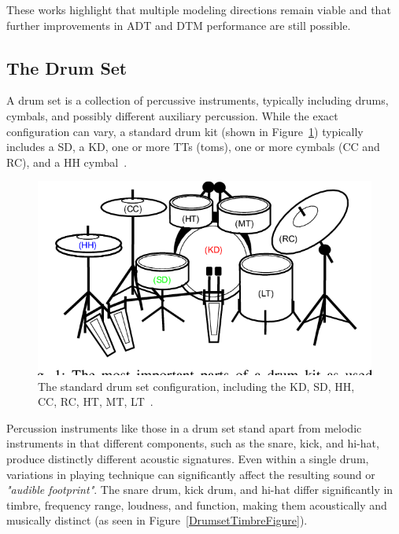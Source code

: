These works highlight that multiple modeling directions remain viable and that further improvements in \gls{ADT} and \gls{DTM} performance are still possible.

\subsection{The Drum Set}

A drum set is a collection of percussive instruments, typically including drums, cymbals, and possibly different auxiliary percussion. While the exact configuration can vary, a standard drum kit (shown in Figure~\ref{DrumsetFigure}) typically includes a \gls{SD}, a \acrfull{KD}, one or more \glspl{TT} (toms), one or more cymbals (\gls{CC} and \gls{RC}), and a \gls{HH} cymbal~\cite{TheDrumHandbook2003}.

\begin{figure}[H]
    \centering
    \includegraphics[scale=0.7, trim={0 1cm 0 0},clip]{figures/drumset}
    \caption{The standard drum set configuration, including the \acrfull{KD}, \acrfull{SD}, \acrfull{HH}, \acrfull{CC}, \acrfull{RC}, \acrfull{HT}, \acrfull{MT}, \acrfull{LT}~\cite{8350302}.}
    \label{DrumsetFigure}
\end{figure}

Percussion instruments like those in a drum set stand apart from melodic instruments in that different components, such as the snare, kick, and hi-hat, produce distinctly different acoustic signatures. Even within a single drum, variations in playing technique can significantly affect the resulting sound or \textit{"audible footprint"}. The snare drum, kick drum, and hi-hat differ significantly in timbre, frequency range, loudness, and function, making them acoustically and musically distinct (as seen in Figure~\ref{DrumsetTimbreFigure}).

